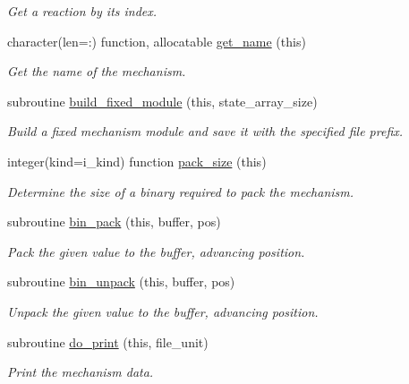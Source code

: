 \begin{DoxyCompactItemize}
\begin{DoxyCompactList}\small\item\em Get a reaction by its index. \end{DoxyCompactList}\item 
character(len=\+:) function, allocatable \mbox{\hyperlink{namespacepmc__mechanism__data_a181513498181e44bd8e3d9cc4aa648e7}{get\+\_\+name}} (this)
\begin{DoxyCompactList}\small\item\em Get the name of the mechanism. \end{DoxyCompactList}\item 
subroutine \mbox{\hyperlink{namespacepmc__mechanism__data_af51515f018cda6a9b93b9f0b23362574}{build\+\_\+fixed\+\_\+module}} (this, state\+\_\+array\+\_\+size)
\begin{DoxyCompactList}\small\item\em Build a fixed mechanism module and save it with the specified file prefix. \end{DoxyCompactList}\item 
integer(kind=i\+\_\+kind) function \mbox{\hyperlink{namespacepmc__mechanism__data_a3b72bf41eb5c1c7f0e9d93f00dc837ae}{pack\+\_\+size}} (this)
\begin{DoxyCompactList}\small\item\em Determine the size of a binary required to pack the mechanism. \end{DoxyCompactList}\item 
subroutine \mbox{\hyperlink{namespacepmc__mechanism__data_a3cecaca4b8f5a851fadd25ad82468c82}{bin\+\_\+pack}} (this, buffer, pos)
\begin{DoxyCompactList}\small\item\em Pack the given value to the buffer, advancing position. \end{DoxyCompactList}\item 
subroutine \mbox{\hyperlink{namespacepmc__mechanism__data_a24709e6abb0a63249db0eec686f64387}{bin\+\_\+unpack}} (this, buffer, pos)
\begin{DoxyCompactList}\small\item\em Unpack the given value to the buffer, advancing position. \end{DoxyCompactList}\item 
subroutine \mbox{\hyperlink{namespacepmc__mechanism__data_a6a010f3dccb9fb0ac7682f5a1bef3d12}{do\+\_\+print}} (this, file\+\_\+unit)
\begin{DoxyCompactList}\small\item\em Print the mechanism data. \end{DoxyCompactList}\item 

\end{DoxyCompactItemize}

